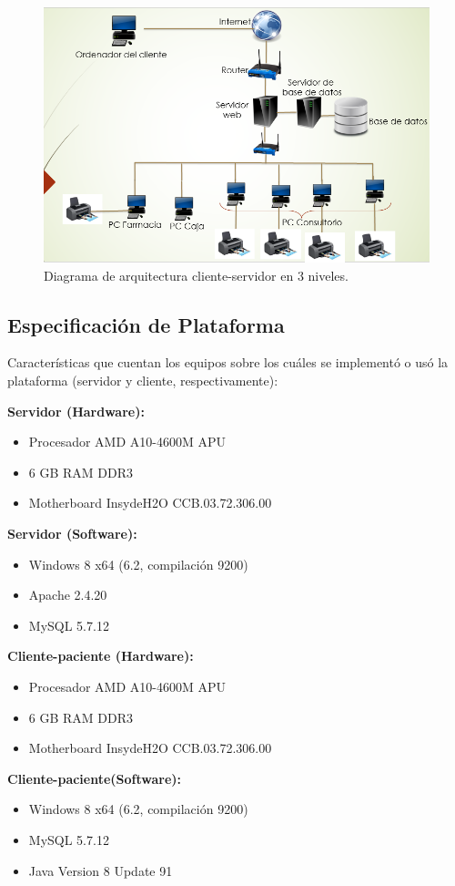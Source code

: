 	\begin{figure}[htbp!]
		\centering
			\includegraphics[width=1.15\textwidth]{images/mod_fis3.png}
		\caption{Diagrama de arquitectura cliente-servidor en 3 niveles.}
	\end{figure}



\subsection{Especificación de Plataforma}
Caracter\'isticas que cuentan los equipos sobre los cu\'ales se implement\'o o us\'o la plataforma (servidor y cliente, respectivamente):


\bfseries Servidor (Hardware): \mdseries
\begin{itemize}
\item Procesador AMD A10-4600M APU
\item 6 GB RAM DDR3
\item Motherboard InsydeH2O CCB.03.72.306.00
\end{itemize}

\bfseries Servidor (Software): \mdseries
\begin{itemize}
\item Windows 8 x64 (6.2, compilaci\'on 9200)
\item Apache 2.4.20
\item MySQL 5.7.12
\end{itemize}

\bfseries Cliente-paciente (Hardware): \mdseries
\begin{itemize}
\item Procesador AMD A10-4600M APU
\item 6 GB RAM DDR3
\item Motherboard InsydeH2O CCB.03.72.306.00
\end{itemize}

\bfseries Cliente-paciente(Software): \mdseries
\begin{itemize}
\item Windows 8 x64 (6.2, compilaci\'on 9200)
\item MySQL 5.7.12
\item Java Version 8 Update 91
\end{itemize}

